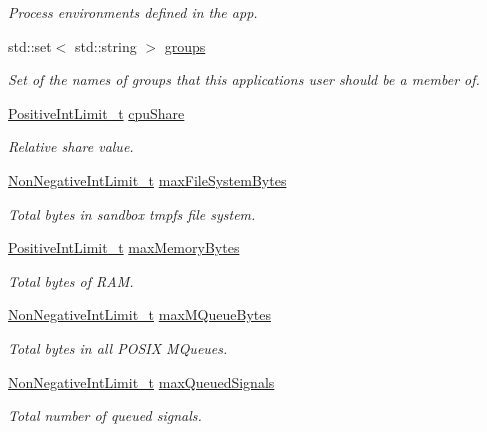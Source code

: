 \begin{DoxyCompactItemize}
\begin{DoxyCompactList}\small\item\em Process environments defined in the app. \end{DoxyCompactList}\item 
std\+::set$<$ std\+::string $>$ \hyperlink{struct_app__t_a740ba5348c4bf0ad1c5744118c3447d4}{groups}
\begin{DoxyCompactList}\small\item\em Set of the names of groups that this application\textquotesingle{}s user should be a member of. \end{DoxyCompactList}\item 
\hyperlink{struct_positive_int_limit__t}{Positive\+Int\+Limit\+\_\+t} \hyperlink{struct_app__t_a97ab412b8d66acce26d69c01aa0727a8}{cpu\+Share}
\begin{DoxyCompactList}\small\item\em Relative share value. \end{DoxyCompactList}\item 
\hyperlink{class_non_negative_int_limit__t}{Non\+Negative\+Int\+Limit\+\_\+t} \hyperlink{struct_app__t_a195ae0750ae4b3a9634ddd99b688dc37}{max\+File\+System\+Bytes}
\begin{DoxyCompactList}\small\item\em Total bytes in sandbox tmpfs file system. \end{DoxyCompactList}\item 
\hyperlink{struct_positive_int_limit__t}{Positive\+Int\+Limit\+\_\+t} \hyperlink{struct_app__t_a8af245479945432500b03c2becae807b}{max\+Memory\+Bytes}
\begin{DoxyCompactList}\small\item\em Total bytes of R\+AM. \end{DoxyCompactList}\item 
\hyperlink{class_non_negative_int_limit__t}{Non\+Negative\+Int\+Limit\+\_\+t} \hyperlink{struct_app__t_af072fb31aebfc7e334af5dfb31021def}{max\+M\+Queue\+Bytes}
\begin{DoxyCompactList}\small\item\em Total bytes in all P\+O\+S\+IX M\+Queues. \end{DoxyCompactList}\item 
\hyperlink{class_non_negative_int_limit__t}{Non\+Negative\+Int\+Limit\+\_\+t} \hyperlink{struct_app__t_a1577bec8faaa625a4a1318ec8794a2a7}{max\+Queued\+Signals}
\begin{DoxyCompactList}\small\item\em Total number of queued signals. \end{DoxyCompactList}\item 

\end{DoxyCompactItemize}
